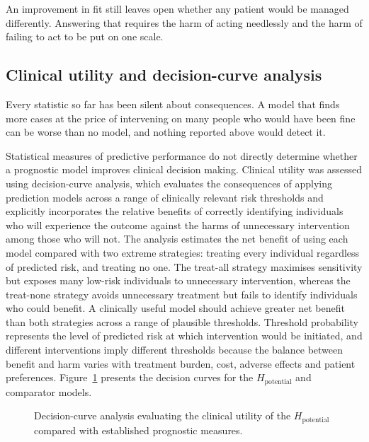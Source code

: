 \medskip
{}

An improvement in fit still leaves open whether any patient would be managed differently. Answering that requires the harm of acting needlessly and the harm of failing to act to be put on one scale.

\subsection{Clinical utility and decision-curve analysis}
\label{sec:prog-dca}

\noindent Every statistic so far has been silent about consequences. A model that finds more cases at the price of intervening on many people who would have been fine can be worse than no model, and nothing reported above would detect it.

Statistical measures of predictive performance do not directly determine whether a prognostic model improves clinical decision making. Clinical utility was assessed using decision-curve \citep{vickers_elkin_2006} analysis, which evaluates the consequences of applying prediction models across a range of clinically relevant risk thresholds and explicitly incorporates the relative benefits of correctly identifying individuals who will experience the outcome against the harms of unnecessary intervention among those who will not. The analysis estimates the net benefit of using each model compared with two extreme strategies: treating every individual regardless of predicted risk, and treating no one. The treat-all strategy maximises sensitivity but exposes many low-risk individuals to unnecessary intervention, whereas the treat-none strategy avoids unnecessary treatment but fails to identify individuals who could benefit. A clinically useful model should achieve greater net benefit than both strategies across a range of plausible thresholds. Threshold probability represents the level of predicted risk at which intervention would be initiated, and different interventions imply different thresholds because the balance between benefit and harm varies with treatment burden, cost, adverse effects and patient preferences. Figure~\ref{fig:dca} presents the decision curves for the $H_{\text{potential}}$ and comparator models.

\begin{figure}[htbp]
\centering
{}
\captionsetup{justification=justified, width=\linewidth}
\caption{Decision-curve analysis evaluating the clinical utility of the $H_{\text{potential}}$ compared with established prognostic measures.}
\label{fig:dca}
\end{figure}


